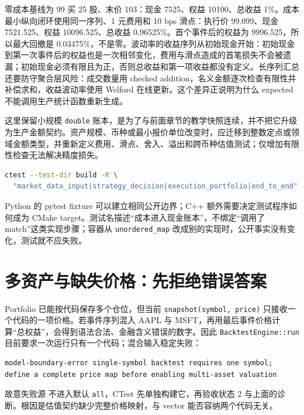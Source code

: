 零成本基线为 99 买 25 股、末价 103：现金 7525、权益 10100、总收益 1\%。成本最小纵向闭环使用同一序列、1 元费用和 10 bps 滑点：执行价 99.099、现金 7521.525、权益 10096.525、总收益 0.96525\%。首个事件后的权益为 9996.525，所以最大回撤是 0.03475\%，不是零。波动率的收益序列从初始现金开始：初始现金到第一次事件后的权益也是一次相邻变化，费用与滑点造成的首笔损失不会被遗漏；初始现金必须有限且为正，否则总收益和第一项收益都没有定义。长序列汇总还要防守聚合层风险：成交数量用 checked addition，名义金额逐次检查有限性并补偿求和，收益波动率使用 Welford 在线更新。这个差异正说明为什么 expected 不能调用生产统计函数重新生成。

这里保留小规模 \texttt{double} 账本，是为了与前面章节的教学快照连续，并不把它升级为生产金额契约。资产规模、币种或最小报价单位改变时，应迁移到整数定点或领域金额类型，并重新定义费用、滑点、舍入、溢出和跨币种估值测试；仅增加有限性检查无法解决精度损失。

\begin{lstlisting}[language=bash,numbers=none]
ctest --test-dir build -R \
  "market_data_input|strategy_decision|execution_portfolio|end_to_end"
\end{lstlisting}

Python 的 pytest fixture 可以建立相同公开边界；C++ 额外需要决定测试程序如何成为 CMake target。测试名描述“成本进入现金账本”，不绑定“调用了 match”这类实现步骤；容器从 \texttt{unordered\_map} 改成别的实现时，公开事实没有变化，测试就不应失败。

\section{多资产与缺失价格：先拒绝错误答案}

Portfolio 已能按代码保存多个仓位，但当前 \texttt{snapshot(symbol, price)} 只接收一个代码的一项价格。若事件序列混入 AAPL 与 MSFT，再用最后事件价格计算“总权益”，会得到语法合法、金融含义错误的数字。因此 \texttt{BacktestEngine::run} 目前要求一次运行只有一个代码；混合输入稳定失败：

\begin{lstlisting}[numbers=none]
model-boundary-error single-symbol backtest requires one symbol; define a complete price map before enabling multi-asset valuation
\end{lstlisting}

故意失败源  不进入默认 \texttt{all}，CTest 先单独构建它，再验收状态 2 与上面的诊断。根因是估值契约缺少完整价格映射，与 vector 能否容纳两个代码无关。

